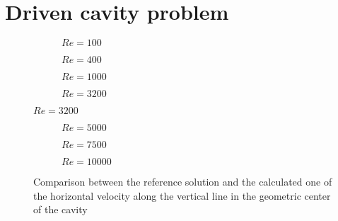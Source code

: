 \chapter{Driven cavity problem}

\begin{figure}[h]
	\centering
	\begin{subfigure}{0.5\textwidth}
		\resizebox{1.4\textwidth}{!}{}
		\caption{$Re=100$}
	\end{subfigure}%
	\begin{subfigure}{0.5\textwidth}
		\resizebox{1.4\textwidth}{!}{}
		\caption{$Re=400$}
	\end{subfigure}
	\begin{subfigure}{0.5\textwidth}
		\resizebox{1.4\textwidth}{!}{}
		\caption{$Re=1000$}
	\end{subfigure}%
	\begin{subfigure}{0.5\textwidth}
		\resizebox{1.4\textwidth}{!}{}
		\caption{$Re=3200$}
	\end{subfigure}
\end{figure}
\begin{figure}\ContinuedFloat
	\begin{subfigure}{0.5\textwidth}
		\resizebox{1.4\textwidth}{!}{}
		\caption{$Re=5000$}
	\end{subfigure}%
	\begin{subfigure}{0.5\textwidth}
		\resizebox{1.4\textwidth}{!}{}
		\caption{$Re=7500$}
	\end{subfigure}
	\begin{subfigure}{0.5\textwidth}
		\center
		\resizebox{1.4\textwidth}{!}{}
		\caption{$Re=10000$}
	\end{subfigure}
	\caption[Comparison between the reference solution and the calculated one of the horizontal velocity along the vertical line in the geometric center of the cavity]{Comparison between the reference solution and the calculated one of the horizontal velocity along the vertical line in the geometric center of the cavity \cite{Ghia1982}}
	\label{Drivenhorizontal}
\end{figure}

